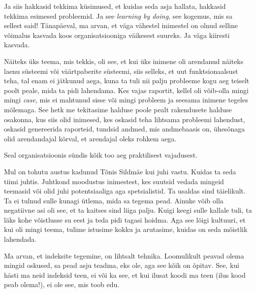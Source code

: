 Ja siis hakkasid tekkima küsimused,  et kuidas seda asja hallata, hakkasid 
tekkima esimesed probleemid. Ja see \emph{learning by doing}, see kogemus, mis 
sa sellest said! Tänapäeval, ma arvan, et väga vähestel inimestel on olnud 
selline võimalus kasvada koos organisatsiooniga väikesest suureks. Ja väga 
kiiresti kasvada. 

Näiteks üks teema, mis tekkis, oli see, et kui üks inimene oli arendanud 
näiteks laenu süsteemi või väärtpaberite süsteemi, siis selleks, et uut 
funktsionaalsust teha, tal enam ei jätkunud aega, kuna ta tuli nii palju 
probleeme kogu aeg teiselt poolt peale, mida ta pidi lahendama. Kes vajas 
raportit, kellel oli võib-olla mingi mingi \emph{case},  mis ei mahtunud sisse 
või mingi  probleem ja seesama inimene tegeles mõlemaga. See hetk me  
tekitasime halduse poole pealt rakendusete halduse osakonna, kus siis olid 
inimesed, kes oskasid teha lihtsama probleemi lahendust, oskasid genereerida 
raporteid, tundsid andmed, mis andmebaasis on, ühesõnaga olid arendandajal 
kõrval, et arendajal oleks rohkem aega. 


Seal organisatsioonis sündis kõik too aeg praktilisest vajadusest. 

Mul on tohutu austus kadunud Tõnis Sildmäe kui juhi 
vastu. Kuidas ta seda tiimi juhtis. Juhtkond moodustus inimestest, kes suutsid 
vedada mingeid teemasid või olid juhi potentsiaaliga aga spetsialistid. Ta 
usaldas sind täielikult. Ta ei tulnud sulle kunagi ütlema, mida sa tegema pead. 
Ainuke võib olla negatiivne asi oli see, et ta kaitses sind liiga palju. Kuigi 
keegi sulle kallale tuli, ta läks kohe võistlusse su eest ja teda pidi tagasi 
hoidma. Aga see lõigi  kultuuri, et kui oli mingi teema, tulime istusime kokku 
ja arutasime, kuidas on seda mõistlik lahendada. 


Ma arvan, et indeksite tegemine, on lihtsalt tehnika. Loomulikult peavad olema 
mingid oskused, sa pead asju teadma, eks ole, aga see kõik on õpitav. See, kui 
hästi ma neid indeksid teen, ei või ka see, et kui ilusat koodi ma teen (ilus 
kood peab olema!), ei ole see, mis toob edu. 

